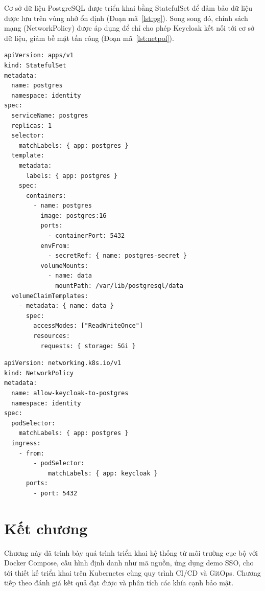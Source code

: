 Cơ sở dữ liệu PostgreSQL được triển khai bằng StatefulSet để đảm bảo dữ liệu
được lưu trên vùng nhớ ổn định (Đoạn mã~\ref{lst:pg}). Song song đó, chính sách
mạng (NetworkPolicy) được áp dụng để chỉ cho phép Keycloak kết nối tới cơ sở dữ
liệu, giảm bề mặt tấn công (Đoạn mã~\ref{lst:netpol}).

\begin{lstlisting}[caption={Manifest StatefulSet cho PostgreSQL},label={lst:pg}]
apiVersion: apps/v1
kind: StatefulSet
metadata:
  name: postgres
  namespace: identity
spec:
  serviceName: postgres
  replicas: 1
  selector:
    matchLabels: { app: postgres }
  template:
    metadata:
      labels: { app: postgres }
    spec:
      containers:
        - name: postgres
          image: postgres:16
          ports:
            - containerPort: 5432
          envFrom:
            - secretRef: { name: postgres-secret }
          volumeMounts:
            - name: data
              mountPath: /var/lib/postgresql/data
  volumeClaimTemplates:
    - metadata: { name: data }
      spec:
        accessModes: ["ReadWriteOnce"]
        resources:
          requests: { storage: 5Gi }
\end{lstlisting}

\begin{lstlisting}[caption={Chinh sach mang gioi han truy cap co so du lieu},label={lst:netpol}]
apiVersion: networking.k8s.io/v1
kind: NetworkPolicy
metadata:
  name: allow-keycloak-to-postgres
  namespace: identity
spec:
  podSelector:
    matchLabels: { app: postgres }
  ingress:
    - from:
        - podSelector:
            matchLabels: { app: keycloak }
      ports:
        - port: 5432
\end{lstlisting}

\section{Kết chương}

Chương này đã trình bày quá trình triển khai hệ thống từ môi trường cục bộ với
Docker Compose, cấu hình định danh như mã nguồn, ứng dụng demo SSO, cho tới
thiết kế triển khai trên Kubernetes cùng quy trình CI/CD và GitOps. Chương tiếp
theo đánh giá kết quả đạt được và phân tích các khía cạnh bảo mật.
